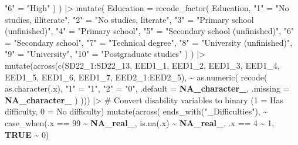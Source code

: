 \documentclass[
  bookmarksnumbered]{article}
\newenvironment{Shaded}{\begin{snugshade}}{\end{snugshade}}
\newcommand{\AttributeTok}[1]{\textcolor[rgb]{0.80,0.80,0.80}{#1}}
\newcommand{\CommentTok}[1]{\textcolor[rgb]{0.50,0.62,0.50}{#1}}
\newcommand{\ConstantTok}[1]{\textcolor[rgb]{0.86,0.64,0.64}{\textbf{#1}}}
\newcommand{\DecValTok}[1]{\textcolor[rgb]{0.86,0.86,0.80}{#1}}
\newcommand{\FunctionTok}[1]{\textcolor[rgb]{0.94,0.94,0.56}{#1}}
\newcommand{\NormalTok}[1]{\textcolor[rgb]{0.80,0.80,0.80}{#1}}
\newcommand{\OtherTok}[1]{\textcolor[rgb]{0.94,0.94,0.56}{#1}}
\newcommand{\SpecialCharTok}[1]{\textcolor[rgb]{0.86,0.64,0.64}{#1}}
\newcommand{\StringTok}[1]{\textcolor[rgb]{0.80,0.58,0.58}{#1}}
\begin{document}
\begin{Shaded}
\begin{Highlighting}[]
      \StringTok{"6"} \OtherTok{=} \StringTok{"High"}
\NormalTok{    )}
\NormalTok{  ) }\SpecialCharTok{|\textgreater{}}
  \FunctionTok{mutate}\NormalTok{(}
    \AttributeTok{Education =} \FunctionTok{recode\_factor}\NormalTok{(}
\NormalTok{      Education,}
      \StringTok{"1"} \OtherTok{=} \StringTok{"No studies, illiterate"}\NormalTok{,}
      \StringTok{"2"} \OtherTok{=} \StringTok{"No studies, literate"}\NormalTok{,}
      \StringTok{"3"} \OtherTok{=} \StringTok{"Primary school (unfinished)"}\NormalTok{,}
      \StringTok{"4"} \OtherTok{=} \StringTok{"Primary school"}\NormalTok{,}
      \StringTok{"5"} \OtherTok{=} \StringTok{"Secondary school (unfinished)"}\NormalTok{,}
      \StringTok{"6"} \OtherTok{=} \StringTok{"Secondary school"}\NormalTok{,}
      \StringTok{"7"} \OtherTok{=} \StringTok{"Technical degree"}\NormalTok{,}
      \StringTok{"8"} \OtherTok{=} \StringTok{"University (unfinished)"}\NormalTok{,}
      \StringTok{"9"} \OtherTok{=} \StringTok{"University"}\NormalTok{,}
      \StringTok{"10"} \OtherTok{=} \StringTok{"Postgraduate studies"}
\NormalTok{    )}
\NormalTok{  ) }\SpecialCharTok{|\textgreater{}}
  \FunctionTok{mutate}\NormalTok{(}\FunctionTok{across}\NormalTok{(}\FunctionTok{c}\NormalTok{(SD22\_1}\SpecialCharTok{:}\NormalTok{SD22\_13, }
\NormalTok{                  EED1\_1,}
\NormalTok{                  EED1\_2,}
\NormalTok{                  EED1\_3,}
\NormalTok{                  EED1\_4,}
\NormalTok{                  EED1\_5,}
\NormalTok{                  EED1\_6,}
\NormalTok{                  EED1\_7,}
\NormalTok{                  EED2\_1}\SpecialCharTok{:}\NormalTok{EED2\_5),}
                \SpecialCharTok{\textasciitilde{}} \FunctionTok{as.numeric}\NormalTok{(}
                  \FunctionTok{recode}\NormalTok{(}
                    \FunctionTok{as.character}\NormalTok{(.x),}
                    \StringTok{"1"} \OtherTok{=} \StringTok{"1"}\NormalTok{,}
                    \StringTok{"2"} \OtherTok{=} \StringTok{"0"}\NormalTok{,}
                    \AttributeTok{.default =} \ConstantTok{NA\_character\_}\NormalTok{,}
                    \AttributeTok{.missing =} \ConstantTok{NA\_character\_}
\NormalTok{                  )}
\NormalTok{                ))) }\SpecialCharTok{|\textgreater{}}
  \CommentTok{\# Convert disability variables to binary (1 = Has difficulty, 0 = No difficulty)}
  \FunctionTok{mutate}\NormalTok{(}\FunctionTok{across}\NormalTok{(}
    \FunctionTok{ends\_with}\NormalTok{(}\StringTok{"\_Difficulties"}\NormalTok{),}
    \SpecialCharTok{\textasciitilde{}} \FunctionTok{case\_when}\NormalTok{(.x }\SpecialCharTok{==} \DecValTok{99} \SpecialCharTok{\textasciitilde{}} \ConstantTok{NA\_real\_}\NormalTok{, }\FunctionTok{is.na}\NormalTok{(.x) }\SpecialCharTok{\textasciitilde{}} \ConstantTok{NA\_real\_}\NormalTok{, .x }\SpecialCharTok{==} \DecValTok{4} \SpecialCharTok{\textasciitilde{}} \DecValTok{1}\NormalTok{, }\ConstantTok{TRUE} \SpecialCharTok{\textasciitilde{}} \DecValTok{0}\NormalTok{)}

\end{Highlighting}
\end{Shaded}
\end{document}
